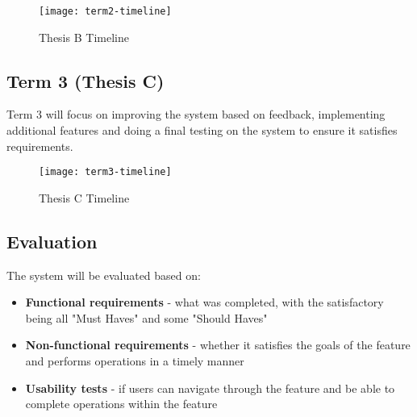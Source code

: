\begin{figure}[h!]
	\centering
	\texttt{[image: term2-timeline]}
	\caption{Thesis B Timeline}
\end{figure}

\subsection{Term 3 (Thesis C)}
Term 3 will focus on improving the system based on feedback, implementing additional features and doing a final testing on the system to ensure it satisfies requirements.\\

\begin{figure}[h!]
	\centering
	\texttt{[image: term3-timeline]}
	\caption{Thesis C Timeline}
\end{figure}


\subsection{Evaluation}
The system will be evaluated based on:
\begin{itemize}
	\item \textbf{Functional requirements} - what was completed, with the satisfactory being all "Must Haves" and some "Should Haves"
	\item \textbf{Non-functional requirements} - whether it satisfies the goals of the feature and performs operations in a timely manner
	\item \textbf{Usability tests} - if users can navigate through the feature and be able to complete operations within the feature
\end{itemize}